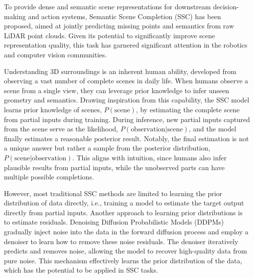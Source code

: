 \documentclass[conference]{IEEEtran}
\begin{document}
To provide dense and semantic scene representations for downstream decision-making and action systems, Semantic Scene Completion (SSC) has been proposed, aimed at jointly predicting missing points and semantics from raw LiDAR point clouds.
Given its potential to significantly improve scene representation quality, this task has garnered significant attention in the robotics and computer vision communities.

Understanding 3D surroundings is an inherent human ability, developed from observing a vast number of complete scenes in daily life.
When humans observe a scene from a single view, they can leverage prior knowledge to infer unseen geometry and semantics.
Drawing inspiration from this capability, the SSC model learns prior knowledge of scenes, $P(\text{scene})$, by estimating the complete scene from partial inputs during training.
During inference, new partial inputs captured from the scene serve as the likelihood, $P(\text{observation}|\text{scene})$, and the model finally estimates a reasonable posterior result.
Notably, the final estimation is not a unique answer but rather a sample from the posterior distribution, $P(\text{scene}|\text{observation})$.
This aligns with intuition, since humans also infer plausible results from partial inputs, while the unobserved parts can have multiple possible completions.

However, most traditional SSC methods are limited to learning the prior distribution of data directly, i.e., training a model to estimate the target output directly from partial inputs.
Another approach to learning prior distributions is to estimate residuals.
Denoising Diffusion Probabilistic Models (DDPMs) gradually inject noise into the data in the forward diffusion process and employ a denoiser to learn how to remove these noise residuals.
The denoiser iteratively predicts and removes noise, allowing the model to recover high-quality data from pure noise.
This mechanism effectively learns the prior distribution of the data, which has the potential to be applied in SSC tasks.
\end{document}
